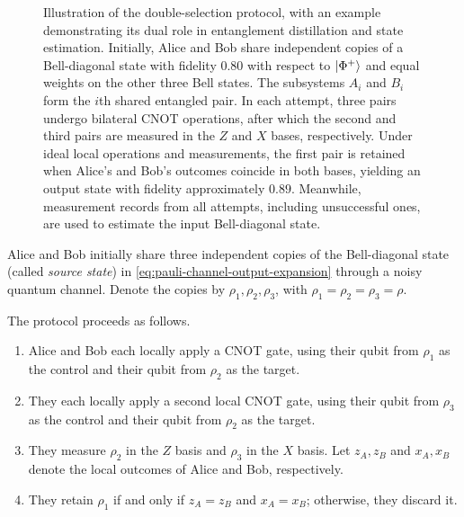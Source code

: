 \begin{figure}[tb]
    \centering
    \resizebox{\textwidth}{!}{%
    }
    \caption{
        Illustration of the double-selection protocol, with an example
        demonstrating its dual role in entanglement distillation and
        state estimation.
        Initially, Alice and Bob share independent copies of a Bell-diagonal
        state with fidelity $0.80$ with respect to $\ket{\Phi^+}$
        and equal weights on the other three Bell states.
        The subsystems $A_i$ and $B_i$ form the $i$th shared entangled pair.
        In each attempt, three pairs undergo bilateral CNOT operations,
        after which the second and third pairs are measured in the
        $Z$ and $X$ bases, respectively.
        Under ideal local operations and measurements, the first pair is
        retained when Alice's and Bob's outcomes coincide in both bases,
        yielding an output state with fidelity approximately $0.89$.
        Meanwhile, measurement records from all attempts, including
        unsuccessful ones, are used to estimate the input Bell-diagonal state.
    }
    \label{fig:double-selection-circuit}
\end{figure}


Alice and Bob initially share three independent copies of the
Bell-diagonal state (called \emph{source state}) in \eqref{eq:pauli-channel-output-expansion} through a noisy quantum channel. Denote the copies by
\(\rho_1,\rho_2,\rho_3\), with
\(\rho_1=\rho_2=\rho_3=\rho\).

The protocol proceeds as follows.
\begin{enumerate}
    \item Alice and Bob each locally apply a  CNOT gate, using their qubit
          from $\rho_1$ as the control and their qubit from $\rho_2$ as
          the target.

    \item They each locally apply  a second local CNOT gate, using their qubit
          from $\rho_3$ as the control and their qubit from $\rho_2$ as
          the target.
    \item They measure \(\rho_2\) in the \(Z\) basis and \(\rho_3\) in
          the \(X\) basis. Let \(z_A,z_B\) and \(x_A,x_B\) denote the local
          outcomes of Alice and Bob, respectively.

    \item They retain \(\rho_1\) if and only if
          \(z_A=z_B\) and \(x_A=x_B\); otherwise, they discard it.
\end{enumerate}


